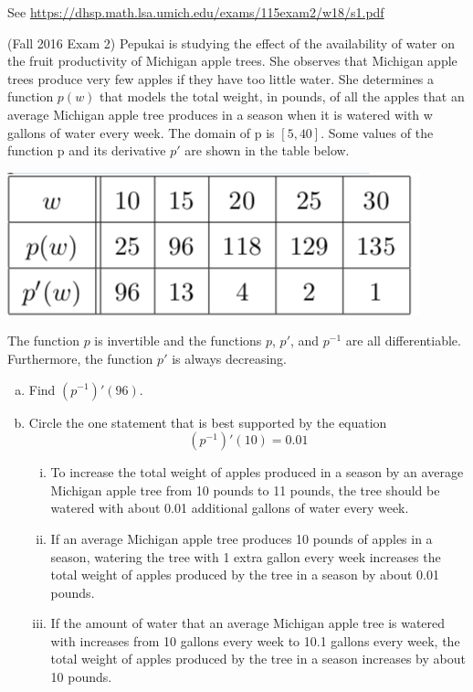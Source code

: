 \documentclass[11pt]{exam}
\begin{document}
\begin{questions}
\begin{enumerate}[(a)]
\end{enumerate}
\begin{solution}
  See \href{https://dhsp.math.lsa.umich.edu/exams/115exam2/w18/s1.pdf}{https://dhsp.math.lsa.umich.edu/exams/115exam2/w18/s1.pdf}
\end{solution}
\question (Fall 2016 Exam 2) %
  Pepukai is studying the effect of the availability of water on the fruit productivity of Michigan apple trees. She observes that Michigan apple trees produce very few apples if they have too little water. She determines a function $p(w)$ that models the total weight, in pounds, of all the apples that an average Michigan apple tree produces in a season when it is watered with w gallons of water every week. The domain of p is $[5, 40]$. Some values of the function p and its derivative $p'$ are shown in the table below.
  \begin{center}
    \includegraphics[scale=0.35]{Figures/table3.png}
  \end{center}
	The function \(p\) is invertible and the functions $p$, $p'$, and $p^{-1}$ are all differentiable. Furthermore, the function $p'$ is always decreasing.
	\begin{enumerate}[(a)]
	\item Find $(p^{-1})'(96)$.
	\item Circle the one statement that is best supported by the equation
	$$(p^{-1})'(10) = 0.01$$
	\begin{enumerate}[(i)]
	\item To increase the total weight of apples produced in a season by an average Michigan apple tree from 10 pounds to 11 pounds, the tree should be watered with about 0.01 additional gallons of water every week.
	\item If an average Michigan apple tree produces 10 pounds of apples in a season, watering the tree with 1 extra gallon every week increases the total weight of apples produced by the tree in a season by about 0.01 pounds.
	\item If the amount of water that an average Michigan apple tree is watered with increases from 10 gallons every week to 10.1 gallons every week, the total weight of apples produced by the tree in a season increases by about 10 pounds.

\end{enumerate}
\end{enumerate}
\end{questions}
\end{document}
